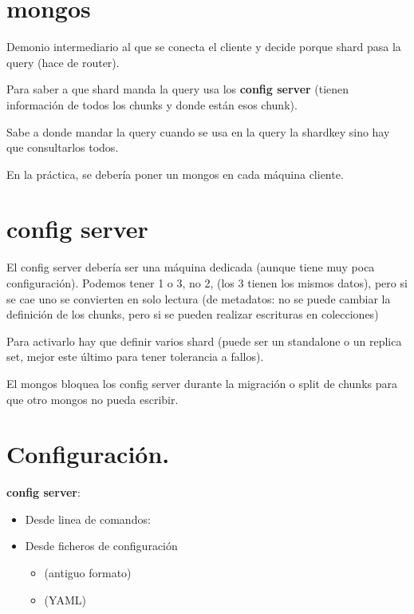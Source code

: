 \documentclass[a4paper,10pt,english]{sphinxmanual}
\begin{document}
\section{mongos}
\label{contents/sharding:mongos}
Demonio intermediario al que se conecta el cliente y decide porque shard pasa la query (hace de router).

Para saber a que shard manda la query usa los \textbf{config server} (tienen información de todos los chunks y donde están esos chunk).

Sabe a donde mandar la query cuando se usa en la query la shardkey sino hay que consultarlos todos.

En la práctica, se debería poner un mongos en cada máquina cliente.


\section{config server}
\label{contents/sharding:config-server}
El config server debería ser una máquina dedicada (aunque tiene muy poca configuración). Podemos tener 1 o 3, no 2, (los 3 tienen los mismos datos), pero si se cae uno se convierten en solo lectura (de metadatos: no se puede cambiar la definición de los chunks, pero si se pueden realizar escrituras en colecciones)

Para activarlo hay que definir varios shard (puede ser un standalone o un replica set, mejor este último para tener tolerancia a fallos).

El mongos bloquea los config server durante la migración o split de chunks para que otro mongos no pueda escribir.


\section{Configuración.}
\label{contents/sharding:configuracion}
\textbf{config server}:
\begin{itemize}
\item {} 
Desde linea de comandos: 

\item {} 
Desde ficheros de configuración
\begin{itemize}
\item {} 
 (antiguo formato)

\item {} 
 (YAML)

\end{itemize}

\end{itemize}
\end{document}
